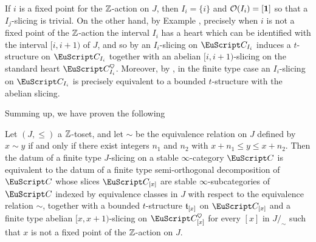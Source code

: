 If $i$ is a fixed point for the $\mathbb{Z}$-action on $J$, then $I_i=\{i\}$ and $\mathcal{O}(I_i)=[\mathbf{1}]$ so that a $I_j$-slicing is trivial. On the other hand, by Example , precisely when $i$ is not a fixed point of the $\mathbb{Z}$-action the interval $I_i$ has a heart which can be identified with the interval $[i,i+1)$ of $J$, and so by \aprop{} an $I_i$-slicing on $\C_{I_i}$ induces a $t$-structure on $\C_{I_i}$ together with an abelian $[i,i+1)$-slicing on the standard heart $\C_{I_i}^\heart$. Moreover, by \aprop{}, in the finite type case an $I_i$-slicing on $\C_{I_i}$ is precisely equivalent to a bounded $t$-structure with the abelian slicing. 

Summing up, we have proven the following
\begin{theorem}\label{conclusion}
Let $(J,\leq)$ a $\mathbb{Z}$-toset, and let $\sim$ be the equivalence relation on $J$ defined by $x\sim y$ if and only if there exist integers $n_1$ and $n_2$ with $x+n_1\leq y\leq x+n_2$. Then the datum of a finite type $J$-slicing on a stable $\infty$-category $\C$ is equivalent to the datum of a finite type semi-orthogonal decomposition of $\C$ whose slices $\C_{[x]}$ are stable  $\infty$-subcategories of $\C$ indexed by equivalence classes in $J$ with respect to the equivalence relation $\sim$, together with a bounded $t$-structure $\mathfrak{t}_{[x]}$ on $\C_{[x]}$ and a finite type abelian $[x,x+1)$-slicing on $\C_{[x]}^\heart$ for every $[x]$ in $J/_{\!\sim}$ such that $x$ is not a fixed point of the $\mathbb{Z}$-action on $J$.
\end{theorem}





